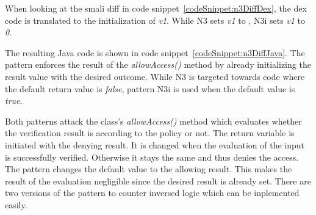 \newline

When looking at the smali diff in code snippet~\ref{codeSnippet:n3DiffDex}, the dex code is translated to the initialization of \textit{v1}.
While N3 sets \textit{v1} to , N3i sets \textit{v1} to \textit{0}.
\newline

The resulting Java code is shown in code snippet~\ref{codeSnippet:n3DiffJava}.
The pattern enforces the result of the \textit{allowAccess()} method by already initializing the result value with the desired outcome.
While N3 is targeted towards code where the default return value is \textit{false}, pattern N3i is used when the default value is \textit{true}.
\newline

Both patterns attack the class's \textit{allowAccess()} method which evaluates whether the verification result is according to the policy or not.
The return variable is initiated with the denying result.
It is changed when the evaluation of the input is successfully verified.
Otherwise it stays the same and thus denies the access.
The pattern changes the default value to the allowing result.
This makes the result of the evaluation negligible since the desired result is already set.
There are two versions of the pattern to counter inversed logic which can be inplemented easily.

